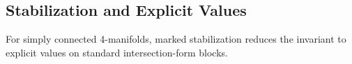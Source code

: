 \subsection{Stabilization and Explicit Values}
\label{sec:stable-calculation}

For simply connected 4-manifolds, marked stabilization reduces the
invariant to explicit values on standard intersection-form blocks.





